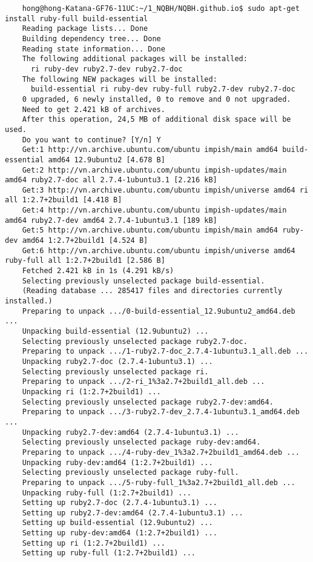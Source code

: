 \documentclass{article}
\numberwithin{equation}{section}
\begin{document}
\begin{verbatim}
	hong@hong-Katana-GF76-11UC:~/1_NQBH/NQBH.github.io$ sudo apt-get install ruby-full build-essential
	Reading package lists... Done
	Building dependency tree... Done
	Reading state information... Done
	The following additional packages will be installed:
	  ri ruby-dev ruby2.7-dev ruby2.7-doc
	The following NEW packages will be installed:
	  build-essential ri ruby-dev ruby-full ruby2.7-dev ruby2.7-doc
	0 upgraded, 6 newly installed, 0 to remove and 0 not upgraded.
	Need to get 2.421 kB of archives.
	After this operation, 24,5 MB of additional disk space will be used.
	Do you want to continue? [Y/n] Y
	Get:1 http://vn.archive.ubuntu.com/ubuntu impish/main amd64 build-essential amd64 12.9ubuntu2 [4.678 B]
	Get:2 http://vn.archive.ubuntu.com/ubuntu impish-updates/main amd64 ruby2.7-doc all 2.7.4-1ubuntu3.1 [2.216 kB]
	Get:3 http://vn.archive.ubuntu.com/ubuntu impish/universe amd64 ri all 1:2.7+2build1 [4.418 B]
	Get:4 http://vn.archive.ubuntu.com/ubuntu impish-updates/main amd64 ruby2.7-dev amd64 2.7.4-1ubuntu3.1 [189 kB]
	Get:5 http://vn.archive.ubuntu.com/ubuntu impish/main amd64 ruby-dev amd64 1:2.7+2build1 [4.524 B]
	Get:6 http://vn.archive.ubuntu.com/ubuntu impish/universe amd64 ruby-full all 1:2.7+2build1 [2.586 B]
	Fetched 2.421 kB in 1s (4.291 kB/s)   
	Selecting previously unselected package build-essential.
	(Reading database ... 285417 files and directories currently installed.)
	Preparing to unpack .../0-build-essential_12.9ubuntu2_amd64.deb ...
	Unpacking build-essential (12.9ubuntu2) ...
	Selecting previously unselected package ruby2.7-doc.
	Preparing to unpack .../1-ruby2.7-doc_2.7.4-1ubuntu3.1_all.deb ...
	Unpacking ruby2.7-doc (2.7.4-1ubuntu3.1) ...
	Selecting previously unselected package ri.
	Preparing to unpack .../2-ri_1%3a2.7+2build1_all.deb ...
	Unpacking ri (1:2.7+2build1) ...
	Selecting previously unselected package ruby2.7-dev:amd64.
	Preparing to unpack .../3-ruby2.7-dev_2.7.4-1ubuntu3.1_amd64.deb ...
	Unpacking ruby2.7-dev:amd64 (2.7.4-1ubuntu3.1) ...
	Selecting previously unselected package ruby-dev:amd64.
	Preparing to unpack .../4-ruby-dev_1%3a2.7+2build1_amd64.deb ...
	Unpacking ruby-dev:amd64 (1:2.7+2build1) ...
	Selecting previously unselected package ruby-full.
	Preparing to unpack .../5-ruby-full_1%3a2.7+2build1_all.deb ...
	Unpacking ruby-full (1:2.7+2build1) ...
	Setting up ruby2.7-doc (2.7.4-1ubuntu3.1) ...
	Setting up ruby2.7-dev:amd64 (2.7.4-1ubuntu3.1) ...
	Setting up build-essential (12.9ubuntu2) ...
	Setting up ruby-dev:amd64 (1:2.7+2build1) ...
	Setting up ri (1:2.7+2build1) ...
	Setting up ruby-full (1:2.7+2build1) ...
\end{verbatim}
\end{document}
